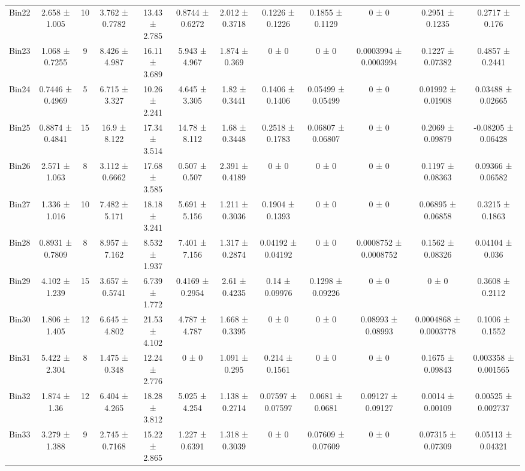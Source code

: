\begin{tabular}{@{\extracolsep{4pt}}lccccccccccc@{}}
     Bin22 & 2.658 ± 1.005 & 10 & 3.762 ± 0.7782 & 13.43 ± 2.785 & 0.8744 ± 0.6272 & 2.012 ± 0.3718 & 0.1226 ± 0.1226 & 0.1855 ± 0.1129 & 0 ± 0 & 0.2951 ± 0.1235 & 0.2717 ± 0.176 \\ 
     Bin23 & 1.068 ± 0.7255 & 9 & 8.426 ± 4.987 & 16.11 ± 3.689 & 5.943 ± 4.967 & 1.874 ± 0.369 & 0 ± 0 & 0 ± 0 & 0.0003994 ± 0.0003994 & 0.1227 ± 0.07382 & 0.4857 ± 0.2441 \\ 
     Bin24 & 0.7446 ± 0.4969 & 5 & 6.715 ± 3.327 & 10.26 ± 2.241 & 4.645 ± 3.305 & 1.82 ± 0.3441 & 0.1406 ± 0.1406 & 0.05499 ± 0.05499 & 0 ± 0 & 0.01992 ± 0.01908 & 0.03488 ± 0.02665 \\ 
     Bin25 & 0.8874 ± 0.4841 & 15 & 16.9 ± 8.122 & 17.34 ± 3.514 & 14.78 ± 8.112 & 1.68 ± 0.3448 & 0.2518 ± 0.1783 & 0.06807 ± 0.06807 & 0 ± 0 & 0.2069 ± 0.09879 & -0.08205 ± 0.06428 \\ 
     Bin26 & 2.571 ± 1.063 & 8 & 3.112 ± 0.6662 & 17.68 ± 3.585 & 0.507 ± 0.507 & 2.391 ± 0.4189 & 0 ± 0 & 0 ± 0 & 0 ± 0 & 0.1197 ± 0.08363 & 0.09366 ± 0.06582 \\ 
     Bin27 & 1.336 ± 1.016 & 10 & 7.482 ± 5.171 & 18.18 ± 3.241 & 5.691 ± 5.156 & 1.211 ± 0.3036 & 0.1904 ± 0.1393 & 0 ± 0 & 0 ± 0 & 0.06895 ± 0.06858 & 0.3215 ± 0.1863 \\ 
     Bin28 & 0.8931 ± 0.7809 & 8 & 8.957 ± 7.162 & 8.532 ± 1.937 & 7.401 ± 7.156 & 1.317 ± 0.2874 & 0.04192 ± 0.04192 & 0 ± 0 & 0.0008752 ± 0.0008752 & 0.1562 ± 0.08326 & 0.04104 ± 0.036 \\ 
     Bin29 & 4.102 ± 1.239 & 15 & 3.657 ± 0.5741 & 6.739 ± 1.772 & 0.4169 ± 0.2954 & 2.61 ± 0.4235 & 0.14 ± 0.09976 & 0.1298 ± 0.09226 & 0 ± 0 & 0 ± 0 & 0.3608 ± 0.2112 \\ 
     Bin30 & 1.806 ± 1.405 & 12 & 6.645 ± 4.802 & 21.53 ± 4.102 & 4.787 ± 4.787 & 1.668 ± 0.3395 & 0 ± 0 & 0 ± 0 & 0.08993 ± 0.08993 & 0.0004868 ± 0.0003778 & 0.1006 ± 0.1552 \\ 
     Bin31 & 5.422 ± 2.304 & 8 & 1.475 ± 0.348 & 12.24 ± 2.776 & 0 ± 0 & 1.091 ± 0.295 & 0.214 ± 0.1561 & 0 ± 0 & 0 ± 0 & 0.1675 ± 0.09843 & 0.003358 ± 0.001565 \\ 
     Bin32 & 1.874 ± 1.36 & 12 & 6.404 ± 4.265 & 18.28 ± 3.812 & 5.025 ± 4.254 & 1.138 ± 0.2714 & 0.07597 ± 0.07597 & 0.0681 ± 0.0681 & 0.09127 ± 0.09127 & 0.0014 ± 0.00109 & 0.00525 ± 0.002737 \\ 
     Bin33 & 3.279 ± 1.388 & 9 & 2.745 ± 0.7168 & 15.22 ± 2.865 & 1.227 ± 0.6391 & 1.318 ± 0.3039 & 0 ± 0 & 0.07609 ± 0.07609 & 0 ± 0 & 0.07315 ± 0.07309 & 0.05113 ± 0.04321 \\ 

\end{tabular}
